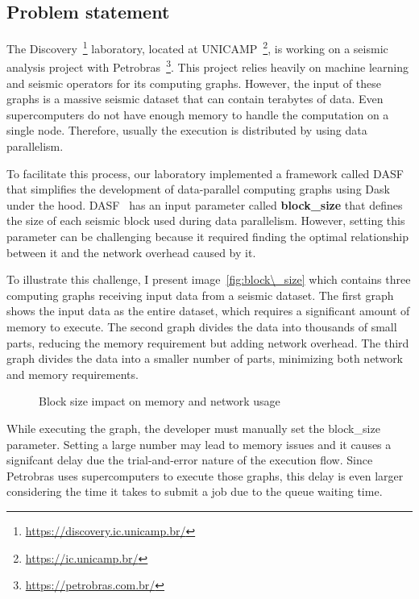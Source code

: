 \subsection{Problem statement}
\label{subsec:problem-statement}

The Discovery~\footnote{\url{https://discovery.ic.unicamp.br/}} laboratory, located at \ac{UNICAMP}~\footnote{\url{https://ic.unicamp.br/}}, is working on a seismic analysis project with Petrobras~\footnote{\url{https://petrobras.com.br/}}.
This project relies heavily on machine learning and seismic operators for its computing graphs.
However, the input of these graphs is a massive seismic dataset that can contain terabytes of data.
Even supercomputers do not have enough memory to handle the computation on a single node.
Therefore, usually the execution is distributed by using data parallelism.

To facilitate this process, our laboratory implemented a framework called \ac{DASF}~\cite{dasf} that simplifies the development of data-parallel computing graphs using Dask~\cite{dask} under the hood.
\ac{DASF}~\cite{dasf} has an input parameter called \textbf{block\_size} that defines the size of each seismic block used during data parallelism.
However, setting this parameter can be challenging because it required finding the optimal relationship between it and the network overhead caused by it.

To illustrate this challenge, I present image~\ref{fig:block\_size} which contains three computing graphs receiving input data from a seismic dataset.
The first graph shows the input data as the entire dataset, which requires a significant amount of memory to execute.
The second graph divides the data into thousands of small parts, reducing the memory requirement but adding network overhead.
The third graph divides the data into a smaller number of parts, minimizing both network and memory requirements.

\begin{figure}[h]
\label{fig:block-size}
\caption{Block size impact on memory and network usage}
\end{figure}

While executing the graph, the developer must manually set the block\_size parameter.
Setting a large number may lead to memory issues and it causes a signifcant delay due the trial-and-error nature of the execution flow.
Since Petrobras uses supercomputers to execute those graphs, this delay is even larger considering the time it takes to submit a job due to the queue waiting time.

